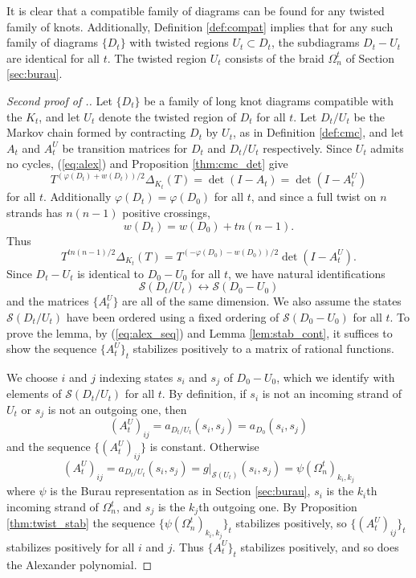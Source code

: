 \documentclass[11pt,hyp,]{nyjm}
\numberwithin{thm}{section}
\theoremstyle{definition}
\theoremstyle{remark}
\begin{document}
	It is clear that a compatible family of diagrams can be found for any twisted family of knots. Additionally, Definition \ref{def:compat} implies that for any such family of diagrams $\{D_t\}$ with twisted regions $U_t \subset D_t$, the subdiagrams $D_t - U_t$ are identical for all $t$. The twisted region $U_t$ consists of the braid $\Omega^t_n$ of Section \ref{sec:burau}.
	
	\begin{proof}[Second proof of \protect{}.]
		Let $\{D_t\}$ be a family of long knot diagrams compatible with the $K_t$, and let $U_t$ denote the twisted region of $D_t$ for all $t$. Let $D_t/U_t$ be the Markov chain formed by contracting $D_t$ by $U_t$, as in Definition \ref{def:cmc}, and let $A_t$ and $A_t^U$ be transition matrices for $D_t$ and $D_t/U_t$ respectively. Since $U_t$ admits no cycles, (\ref{eq:alex}) and Proposition \ref{thm:cmc_det} give
		$$
		T^{(\varphi(D_t) + w(D_t))/2}\Delta_{K_t}(T) = \det(I - A_t) = \det(I - A^U_t)
		$$
		for all $t$. Additionally $\varphi(D_t) = \varphi(D_0)$ for all $t$, and since a full twist on $n$ strands has $n(n - 1)$ positive crossings,
		$$
		w(D_t) = w(D_0) + tn(n - 1).
		$$
		Thus
		\begin{equation}
			\label{eq:alex_seq}
			T^{tn(n - 1)/2} \Delta_{K_t}(T) = T^{(-\varphi(D_0) - w(D_0))/2}\det(I - A^U_t).
		\end{equation}
		Since $D_t - U_t$ is identical to $D_0 - U_0$ for all $t$, we have natural identifications
		$$
		\mathcal{S}(D_t/U_t) \leftrightarrow \mathcal{S}(D_0 - U_0)
		$$
		and the matrices $\{A^U_t\}$ are all of the same dimension. We also assume the states $\mathcal{S}(D_t/U_t)$ have been ordered using a fixed ordering of $\mathcal{S}(D_0 - U_0)$ for all $t$. To prove the lemma, by (\ref{eq:alex_seq}) and Lemma \ref{lem:stab_cont}, it suffices to show the sequence $\{A^U_t\}_t$ stabilizes positively to a matrix of rational functions.
		
		We choose $i$ and $j$ indexing states $s_i$ and $s_j$ of $D_0 - U_0$, which we identify with elements of $	\mathcal{S}(D_t/U_t)$ for all $t$. By definition, if $s_i$ is not an incoming strand of $U_t$ or $s_j$ is not an outgoing one, then
		\begin{equation}
			\label{eq:first_case}
			(A^U_t)_{ij} = a_{D_t/U_t}(s_i,s_j) = a_{D_0}(s_i,s_j)
		\end{equation}
		and the sequence $\{(A^U_t)_{ij}\}$ is constant. Otherwise
		\begin{equation}
			\label{eq:second_case}
			(A^U_t)_{ij} = a_{D_t/U_t}(s_i,s_j) = g|_{\mathcal{S}(U_t)}(s_i,s_j) = \psi(\Omega_n^t)_{k_i,k_j} 
		\end{equation}
		where $\psi$ is the Burau representation as in Section \ref{sec:burau}, $s_i$ is the $k_i$th incoming strand of $\Omega^t_n$, and $s_j$ is the $k_j$th outgoing one. By Proposition \ref{thm:twist_stab} the sequence $\{\psi(\Omega_n^t)_{k_i,k_j}\}_t$ stabilizes positively, so $\{(A^U_t)_{ij}\}_t$ stabilizes positively for all $i$ and $j$. Thus $\{A_t^U\}_t$ stabilizes positively, and so does the Alexander polynomial.
		

\end{proof}
\end{document}
